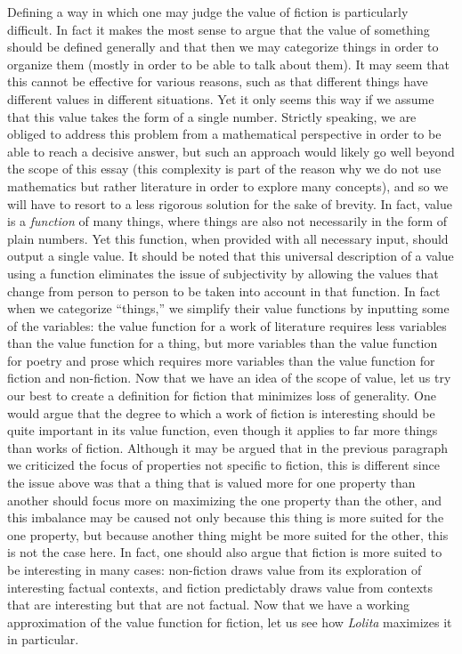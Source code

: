 \documentclass[12pt]{article}
\begin{document}
Defining a way in which one may judge the value of fiction is particularly difficult. In fact it makes the most sense to argue that the value of something should be defined generally and that then we may categorize things in order to organize them (mostly in order to be able to talk about them). It may seem that this cannot be effective for various reasons, such as that different things have different values in different situations. Yet it only seems this way if we assume that this value takes the form of a single number. Strictly speaking, we are obliged to address this problem from a mathematical perspective in order to be able to reach a decisive answer, but such an approach would likely go well beyond the scope of this essay (this complexity is part of the reason why we do not use mathematics but rather literature in order to explore many concepts), and so we will have to resort to a less rigorous solution for the sake of brevity. In fact, value is a \textit{function} of many things, where things are also not necessarily in the form of plain numbers. Yet this function, when provided with all necessary input, should output a single value. It should be noted that this universal description of a value using a function eliminates the issue of subjectivity by allowing the values that change from person to person to be taken into account in that function. In fact when we categorize ``things,'' we simplify their value functions by inputting some of the variables: the value function for a work of literature requires less variables than the value function for a thing, but more variables than the value function for poetry and prose which requires more variables than the value function for fiction and non-fiction. Now that we have an idea of the scope of value, let us try our best to create a definition for fiction that minimizes loss of generality. One would argue that the degree to which a work of fiction is interesting should be quite important in its value function, even though it applies to far more things than works of fiction. Although it may be argued that in the previous paragraph we criticized the focus of properties not specific to fiction, this is different since the issue above was that a thing that is valued more for one property than another should focus more on maximizing the one property than the other, and this imbalance may be caused not only because this thing is more suited for the one property, but because another thing might be more suited for the other, this is not the case here. In fact, one should also argue that fiction is more suited to be interesting in many cases: non-fiction draws value from its exploration of interesting factual contexts, and fiction predictably draws value from contexts that are interesting but that are not factual. Now that we have a working approximation of the value function for fiction, let us see how \textit{Lolita} maximizes it in particular.
\end{document}
